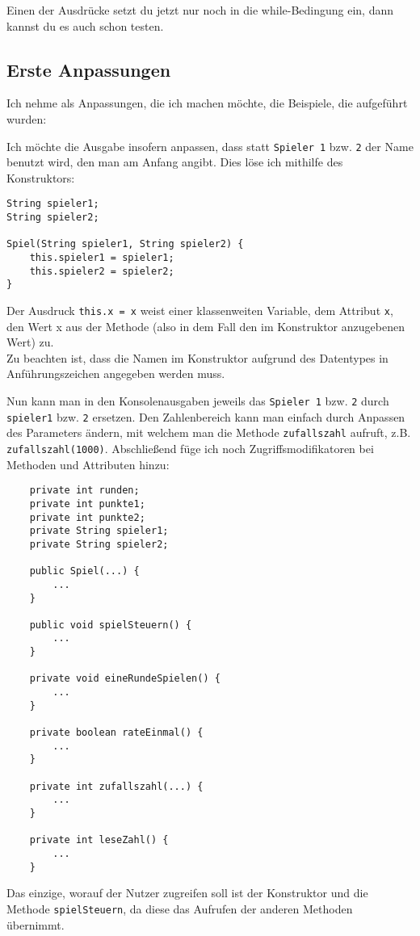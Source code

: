 \documentclass{scrartcl}   %
\begin{document}
\newpage

Einen der Ausdrücke setzt du jetzt nur noch in die while-Bedingung ein, dann kannst du es auch schon testen.

\subsection{Erste Anpassungen}

Ich nehme als Anpassungen, die ich machen möchte, die Beispiele, die aufgeführt wurden:

\begin{itemize}
    \barrow Ich möchte die Ausgabe insofern anpassen, dass statt \texttt{Spieler 1} bzw. \texttt{2} der Name benutzt wird, den man am Anfang angibt. Dies löse ich mithilfe des Konstruktors:\\
    \begin{lstlisting}
String spieler1;
String spieler2;
    
Spiel(String spieler1, String spieler2) {
    this.spieler1 = spieler1;
    this.spieler2 = spieler2;
}
    \end{lstlisting}
    
    Der Ausdruck \texttt{this.x = x} weist einer klassenweiten Variable, dem Attribut \texttt{x}, den Wert x aus der Methode (also in dem Fall den im Konstruktor anzugebenen Wert) zu.\\
    Zu beachten ist, dass die Namen im Konstruktor aufgrund des Datentypes in Anführungszeichen angegeben werden muss.
    
    Nun kann man in den Konsolenausgaben jeweils das \texttt{Spieler 1} bzw. \texttt{2} durch \texttt{spieler1} bzw. \texttt{2} ersetzen.
    \barrow Den Zahlenbereich kann man einfach durch Anpassen des Parameters ändern, mit welchem man die Methode \texttt{zufallszahl} aufruft, z.B. \texttt{zufallszahl(1000)}.
    \barrow Abschließend füge ich noch Zugriffsmodifikatoren bei Methoden und Attributen hinzu:
    
    \begin{lstlisting}
    private int runden;
    private int punkte1;
    private int punkte2;
    private String spieler1;
    private String spieler2;
    
    public Spiel(...) {
        ...
    }
    
    public void spielSteuern() {
        ...
    }
    
    private void eineRundeSpielen() {
        ...
    }
    
    private boolean rateEinmal() {
        ...
    }

    private int zufallszahl(...) {
        ...
    }

    private int leseZahl() {
        ...
    }
    \end{lstlisting}
    
    Das einzige, worauf der Nutzer zugreifen soll ist der Konstruktor und die Methode \texttt{spielSteuern}, da diese das Aufrufen der anderen Methoden übernimmt.
    
\end{itemize}
\end{document}
